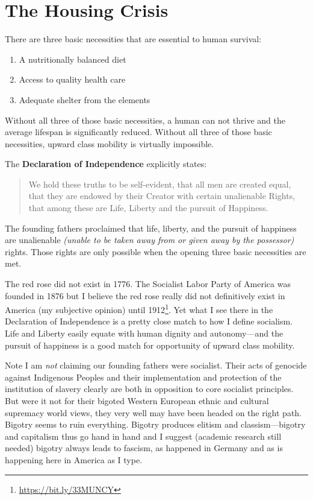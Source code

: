 \section{The Housing Crisis}

There are three basic necessities that are essential to human survival:

\begin{enumerate}
\item A nutritionally balanced diet
\item Access to quality health care
\item Adequate shelter from the elements
\end{enumerate}

Without all three of those basic necessities, a human can not thrive and the average lifespan is significantly reduced. Without all three of those basic necessities, upward class mobility is virtually impossible.

The \textbf{Declaration of Independence} explicitly states:

\begin{quote}
{%
We hold these truths to be self-evident, that all men are created equal, that they are endowed by their Creator with certain unalienable Rights, that among these are Life, Liberty and the pursuit of Happiness.}
\end{quote}

The founding fathers proclaimed that life, liberty, and the pursuit of happiness are unalienable \emph{(unable to be taken away from or given away by the possessor)} rights. Those rights are only possible when the opening three basic necessities are met.

The red rose did not exist in 1776. The Socialist Labor Party of America was founded in 1876 but I believe the red rose really did not definitively exist in America (my subjective opinion) until 1912\footnote{\url{https://bit.ly/33MUNCY}}. Yet what I see there in the Declaration of Independence is a pretty close match to how I define socialism. Life and Liberty easily equate with human dignity and autonomy---and the pursuit of happiness is a good match for opportunity of upward class mobility.

Note I am \emph{not} claiming our founding fathers were socialist. Their acts of genocide against Indigenous Peoples and their implementation and protection of the institution of slavery clearly are both in opposition to core socialist principles. But were it not for their bigoted Western European ethnic and cultural supremacy world views, they very well may have been headed on the right path. Bigotry seems to ruin everything. Bigotry produces elitism and classism---bigotry and capitalism thus go hand in hand and I suggest (academic research still needed) bigotry always leads to fascism, as happened in Germany and as is happening here in America as I type.

